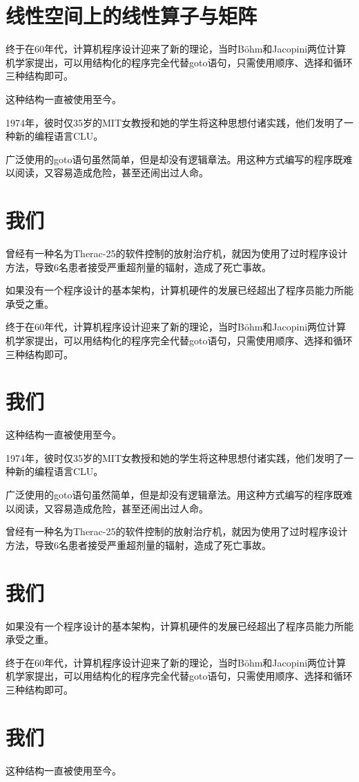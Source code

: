 \documentclass[custom]{linearbook}
\begin{document}
\section{线性空间上的线性算子与矩阵}
终于在60年代，计算机程序设计迎来了新的理论，当时Böhm和Jacopini两位计算机学家提出，可以用结构化的程序完全代替goto语句，只需使用顺序、选择和循环三种结构即可。

这种结构一直被使用至今。

1974年，彼时仅35岁的MIT女教授和她的学生将这种思想付诸实践，他们发明了一种新的编程语言CLU。

广泛使用的goto语句虽然简单，但是却没有逻辑章法。用这种方式编写的程序既难以阅读，又容易造成危险，甚至还闹出过人命。
\section{我们}
曾经有一种名为Therac-25的软件控制的放射治疗机，就因为使用了过时程序设计方法，导致6名患者接受严重超剂量的辐射，造成了死亡事故。

如果没有一个程序设计的基本架构，计算机硬件的发展已经超出了程序员能力所能承受之重。

终于在60年代，计算机程序设计迎来了新的理论，当时Böhm和Jacopini两位计算机学家提出，可以用结构化的程序完全代替goto语句，只需使用顺序、选择和循环三种结构即可。
\section{我们}
这种结构一直被使用至今。

1974年，彼时仅35岁的MIT女教授和她的学生将这种思想付诸实践，他们发明了一种新的编程语言CLU。

广泛使用的goto语句虽然简单，但是却没有逻辑章法。用这种方式编写的程序既难以阅读，又容易造成危险，甚至还闹出过人命。

曾经有一种名为Therac-25的软件控制的放射治疗机，就因为使用了过时程序设计方法，导致6名患者接受严重超剂量的辐射，造成了死亡事故。
\section{我们}
如果没有一个程序设计的基本架构，计算机硬件的发展已经超出了程序员能力所能承受之重。

终于在60年代，计算机程序设计迎来了新的理论，当时Böhm和Jacopini两位计算机学家提出，可以用结构化的程序完全代替goto语句，只需使用顺序、选择和循环三种结构即可。
\section{我们}
这种结构一直被使用至今。
\end{document}
